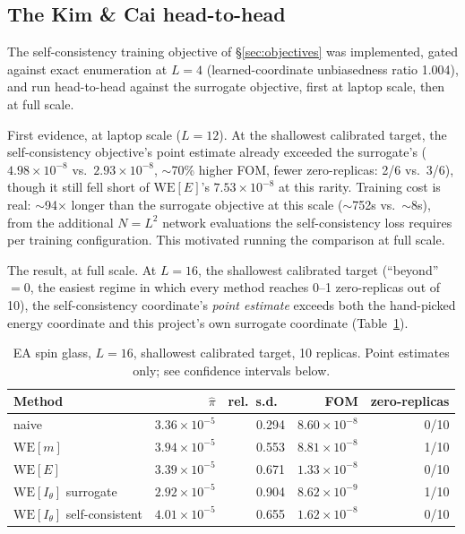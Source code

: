 \documentclass[a4paper,fleqn]{cas-sc}
\begin{document}
\subsection{The Kim \& Cai head-to-head}\label{sec:kimcai}
The self-consistency training objective of \S\ref{sec:objectives} was implemented, gated
against exact enumeration at $L=4$ (learned-coordinate unbiasedness ratio 1.004), and run
head-to-head against the surrogate objective, first at laptop scale, then at full scale.

First evidence, at laptop scale ($L=12$). At the shallowest calibrated target, the
self-consistency objective's point estimate already exceeded the surrogate's
($4.98\times10^{-8}$ vs.\ $2.93\times10^{-8}$, $\sim$70\% higher FOM, fewer zero-replicas:
2/6 vs.\ 3/6), though it still fell short of $\mathrm{WE}[E]$'s $7.53\times10^{-8}$ at this
rarity. Training cost is real: $\sim$94$\times$ longer than the surrogate objective at this
scale ($\sim$752s vs.\ $\sim$8s), from the additional $N=L^2$ network evaluations the
self-consistency loss requires per training configuration. This motivated running the
comparison at full scale.

The result, at full scale. At $L=16$, the shallowest calibrated target (``beyond''\,$=0$,
the easiest regime in which every method reaches 0--1 zero-replicas out of 10), the
self-consistency coordinate's \emph{point estimate} exceeds both the hand-picked energy
coordinate and this project's own surrogate coordinate (Table~\ref{tab:kimcai}).

\begin{table}[H]
\centering\small
\caption{EA spin glass, $L=16$, shallowest calibrated target, 10 replicas. Point estimates
	only; see confidence intervals below.}
\label{tab:kimcai}
\begin{tabular}{lrrrr}
	\toprule
	Method & $\hat\pi$ & rel.\ s.d.\ & FOM & zero-replicas \\
	\midrule
	naive & $3.36\times10^{-5}$ & 0.294 & $8.60\times10^{-8}$ & 0/10 \\
	$\mathrm{WE}[m]$ & $3.94\times10^{-5}$ & 0.553 & $8.81\times10^{-8}$ & 1/10 \\
	$\mathrm{WE}[E]$ & $3.39\times10^{-5}$ & 0.671 & $1.33\times10^{-8}$ & 0/10 \\
	$\mathrm{WE}[I_\theta]$ surrogate & $2.92\times10^{-5}$ & 0.904 & $8.62\times10^{-9}$ & 1/10 \\
	$\mathrm{WE}[I_\theta]$ self-consistent & $4.01\times10^{-5}$ & 0.655 &
	$1.62\times10^{-8}$ & 0/10 \\
	\bottomrule
\end{tabular}
\end{table}
\end{document}
